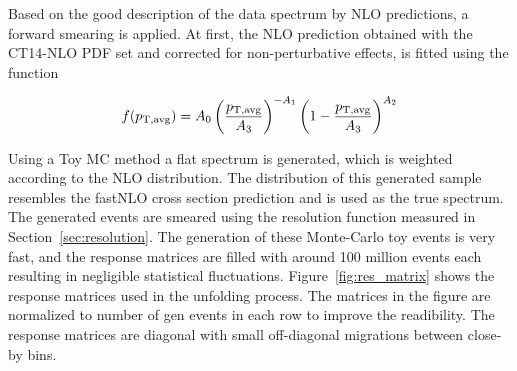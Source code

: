 Based on the good description of the data spectrum by NLO predictions, a forward
smearing is applied. At first, the NLO prediction obtained with the CT14-NLO PDF
set and corrected for non-perturbative effects, is fitted using the function

\begin{equation}
    f(p_{\mathrm{T,avg}}) = A_0 \left(
    \frac{p_{\mathrm{T,avg}}}{A_3}\right)^{-A_1}\left(1-\frac{p_{\mathrm{T,avg}}}{A_3}\right)^{A_2}
\end{equation}

Using a Toy MC method a flat \ptavg spectrum is generated, which is weighted
according to the NLO distribution. The distribution of this generated sample
resembles the fastNLO cross section prediction and is used as the true \ptavg
spectrum. The generated events are smeared using the resolution function
measured in Section~\ref{sec:resolution}. The generation of these Monte-Carlo
toy events is very fast, and the response matrices are filled with around 100
million events each resulting in negligible statistical fluctuations.
Figure~\ref{fig:res_matrix} shows the response matrices used in the unfolding
process. The matrices in the figure are normalized to number of gen events in
each row to improve the readibility. The response matrices are diagonal with
small off-diagonal migrations between close-by \ptavg bins.

